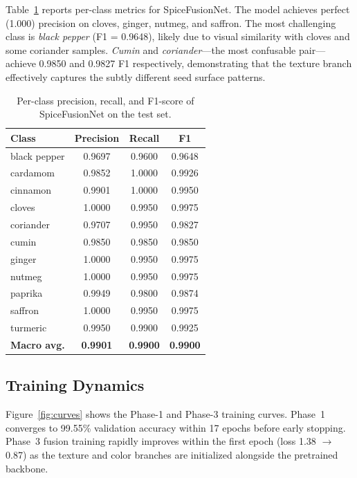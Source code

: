 \documentclass[conference]{IEEEtran}
\begin{document}
Table~\ref{tab:perclass} reports per-class metrics for SpiceFusionNet. The model
achieves perfect (1.000) precision on cloves, ginger, nutmeg, and saffron.
The most challenging class is \textit{black pepper} (F1 = 0.9648), likely due to
visual similarity with cloves and some coriander samples. \textit{Cumin} and
\textit{coriander}—the most confusable pair—achieve 0.9850 and 0.9827 F1
respectively, demonstrating that the texture branch effectively captures the
subtly different seed surface patterns.

\begin{table}[t]
\centering
\caption{Per-class precision, recall, and F1-score of SpiceFusionNet on the test set.}
\label{tab:perclass}
\setlength{\tabcolsep}{4pt}
\begin{tabular}{lccc}
\toprule
\textbf{Class} & \textbf{Precision} & \textbf{Recall} & \textbf{F1} \\
\midrule
black pepper  & 0.9697 & 0.9600 & 0.9648 \\
cardamom      & 0.9852 & 1.0000 & 0.9926 \\
cinnamon      & 0.9901 & 1.0000 & 0.9950 \\
cloves        & 1.0000 & 0.9950 & 0.9975 \\
coriander     & 0.9707 & 0.9950 & 0.9827 \\
cumin         & 0.9850 & 0.9850 & 0.9850 \\
ginger        & 1.0000 & 0.9950 & 0.9975 \\
nutmeg        & 1.0000 & 0.9950 & 0.9975 \\
paprika       & 0.9949 & 0.9800 & 0.9874 \\
saffron       & 1.0000 & 0.9950 & 0.9975 \\
turmeric      & 0.9950 & 0.9900 & 0.9925 \\
\midrule
\textbf{Macro avg.} & \textbf{0.9901} & \textbf{0.9900} & \textbf{0.9900} \\
\bottomrule
\end{tabular}
\end{table}

\subsection{Training Dynamics}
Figure~\ref{fig:curves} shows the Phase-1 and Phase-3 training curves. Phase~1
converges to 99.55\% validation accuracy within 17 epochs before early stopping.
Phase~3 fusion training rapidly improves within the first epoch (loss 1.38 $\to$ 0.87)
as the texture and color branches are initialized alongside the pretrained backbone.
\end{document}
